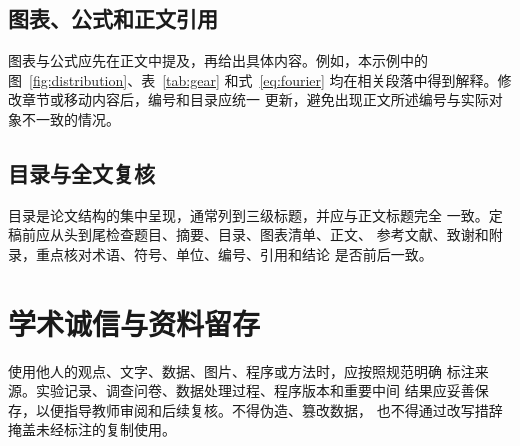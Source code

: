 \subsection{图表、公式和正文引用}

图表与公式应先在正文中提及，再给出具体内容。例如，本示例中的
图~\ref{fig:distribution}、表~\ref{tab:gear} 和式~\eqref{eq:fourier}
均在相关段落中得到解释。修改章节或移动内容后，编号和目录应统一
更新，避免出现正文所述编号与实际对象不一致的情况。

\subsection{目录与全文复核}

目录是论文结构的集中呈现，通常列到三级标题，并应与正文标题完全
一致。定稿前应从头到尾检查题目、摘要、目录、图表清单、正文、
参考文献、致谢和附录，重点核对术语、符号、单位、编号、引用和结论
是否前后一致。

\section{学术诚信与资料留存}

使用他人的观点、文字、数据、图片、程序或方法时，应按照规范明确
标注来源。实验记录、调查问卷、数据处理过程、程序版本和重要中间
结果应妥善保存，以便指导教师审阅和后续复核。不得伪造、篡改数据，
也不得通过改写措辞掩盖未经标注的复制使用。
